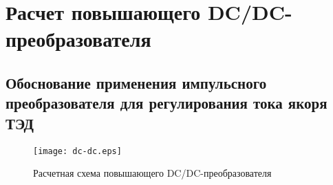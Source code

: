 \chapter{Расчет повышающего DC/DC-преобразователя}

\section{Обоснование применения импульсного преобразователя для регулирования тока якоря ТЭД}

\begin{figure}[H]
    \centering    
    \texttt{[image: dc-dc.eps]}
    \caption{Расчетная схема повышающего DC/DC-преобразователя}
    \label{fig:out_char_vuv}
\end{figure}
